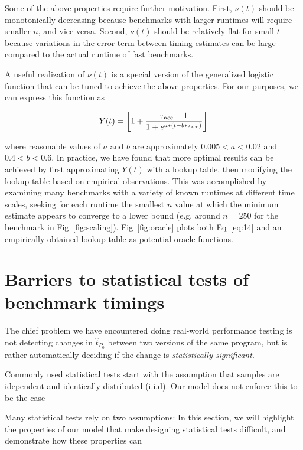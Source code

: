 \documentclass[conference]{IEEEtran}
\DeclarePairedDelimiter\floor{\lfloor}{\rfloor}
\begin{document}
Some of the above properties require further motivation. First, $\nu(t)$ should be
monotonically decreasing because benchmarks with larger runtimes will require smaller $n$,
and vice versa. Second, $\nu(t)$ should be relatively flat for small $t$ because variations
in the error term between timing estimates can be large compared to the actual runtime of
fast benchmarks.

A useful realization of $\nu(t)$ is a special version of the generalized logistic function
that can be tuned to achieve the above properties. For our purposes, we can express this
function as

\begin{equation}
    Y(t) = \floor*{1 + \frac{\tau_{\textrm{acc}} - 1}{1 + e^{a * (t - b*\tau_{\textrm{acc}})}}}
\end{equation}

where reasonable values of $a$ and $b$ are approximately $0.005 < a < 0.02$ and $0.4 < b <
0.6$. In practice, we have found that more optimal results can be achieved by first
approximating $Y(t)$ with a lookup table, then modifying the lookup table based on empirical
observations. This was accomplished by examining many benchmarks with a variety of known
runtimes at different time scales, seeking for each runtime the smallest $n$ value at which
the minimum estimate appears to converge to a lower bound (e.g. around $n = 250$ for the
benchmark in Fig~\ref{fig:scaling}). Fig~\ref{fig:oracle} plots both Eq~\ref{eq:14} and an
empirically obtained lookup table as potential oracle functions.

\label{sec:hypotesting}
\section{Barriers to statistical tests of benchmark timings}

The chief problem we have encountered doing real-world performance testing is not detecting
changes in $\hat{t}_{P_0}$ between two versions of the same program, but is rather
automatically deciding if the change is \textit{statistically significant}.

Commonly used statistical tests start with the assumption that samples are idependent and
identically distributed (i.i.d). Our model does not enforce this to be the case


Many statistical tests rely on two assumptions:
In this section, we will highlight the properties of our model that make designing
statistical tests difficult, and demonstrate how these properties can
\end{document}
